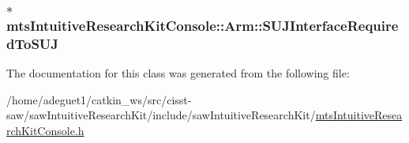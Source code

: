 \hypertarget{classmts_intuitive_research_kit_console_1_1_arm_a42263c728ca5e3283d74330cdae3aeb7}{
\subsubsection[{S\-U\-J\-Interface\-Required\-To\-S\-U\-J}]{$\ast$ mts\-Intuitive\-Research\-Kit\-Console\-::\-Arm\-::\-S\-U\-J\-Interface\-Required\-To\-S\-U\-J\hspace{0.3cm}{\ttfamily [protected]}}}\label{classmts_intuitive_research_kit_console_1_1_arm_a42263c728ca5e3283d74330cdae3aeb7}


The documentation for this class was generated from the following file\-:\begin{DoxyCompactItemize}
\item 
/home/adeguet1/catkin\-\_\-ws/src/cisst-\/saw/saw\-Intuitive\-Research\-Kit/include/saw\-Intuitive\-Research\-Kit/\hyperlink{mts_intuitive_research_kit_console_8h}{mts\-Intuitive\-Research\-Kit\-Console.\-h}\end{DoxyCompactItemize}
